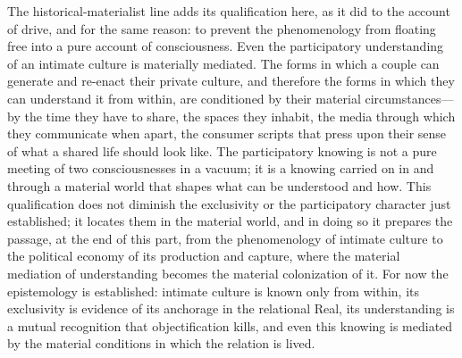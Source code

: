 The historical-materialist line adds its qualification here, as it did to the account of drive, and for the same reason: to prevent the phenomenology from floating free into a pure account of consciousness. Even the participatory understanding of an intimate culture is materially mediated. The forms in which a couple can generate and re-enact their private culture, and therefore the forms in which they can understand it from within, are conditioned by their material circumstances---by the time they have to share, the spaces they inhabit, the media through which they communicate when apart, the consumer scripts that press upon their sense of what a shared life should look like. The participatory knowing is not a pure meeting of two consciousnesses in a vacuum; it is a knowing carried on in and through a material world that shapes what can be understood and how. This qualification does not diminish the exclusivity or the participatory character just established; it locates them in the material world, and in doing so it prepares the passage, at the end of this part, from the phenomenology of intimate culture to the political economy of its production and capture, where the material mediation of understanding becomes the material colonization of it. For now the epistemology is established: intimate culture is known only from within, its exclusivity is evidence of its anchorage in the relational Real, its understanding is a mutual recognition that objectification kills, and even this knowing is mediated by the material conditions in which the relation is lived.
